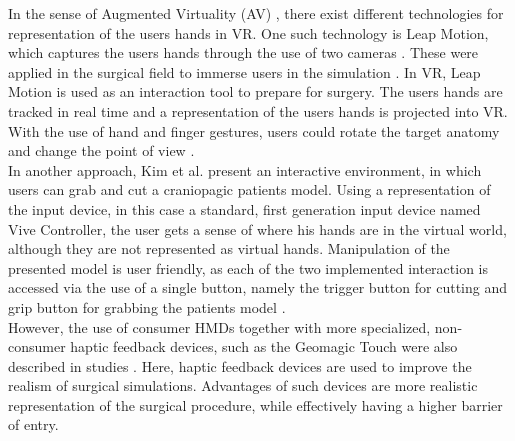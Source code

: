 In the sense of Augmented Virtuality (AV) \cite{milgram1994taxonomy}, there exist different technologies for representation of the users hands in VR.
One such technology is Leap Motion, which captures the users hands through the use of two cameras \cite{LeapMotion}.
These were applied in the surgical field to immerse users in the simulation \cite{VenkataS.Arikatla.2018,Sampogna.2017}.
In VR, Leap Motion is used as an interaction tool to prepare for surgery.
The users hands are tracked in real time and a representation of the users hands is projected into VR.
With the use of hand and finger gestures, users could rotate the target anatomy and change the point of view \cite{Sampogna.2017}.
\\ In another approach, Kim et al. \cite{kim2017virtual} present an interactive environment, in which users can grab and cut a craniopagic patients model.
Using a representation of the input device, in this case a standard, first generation input device named Vive Controller, the user gets a sense of where 
his hands are in the virtual world, although they are not represented as virtual hands. 
Manipulation of the presented model is user friendly, as each of the two implemented interaction is accessed via the use of a single button, namely the 
trigger button for cutting and grip button for grabbing the patients model \cite{.2017}.
\\ However, the use of consumer HMDs together with more specialized, non-consumer haptic feedback devices, such as the Geomagic Touch were also described in studies \cite{VenkataS.Arikatla.2018}.
Here, haptic feedback devices are used to improve the realism of surgical simulations.
Advantages of such devices are more realistic representation of the surgical procedure, while effectively having a higher barrier of entry.